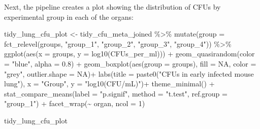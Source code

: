 \documentclass[
]{book}
\newenvironment{Shaded}{\begin{snugshade}}{\end{snugshade}}
\newcommand{\AttributeTok}[1]{\textcolor[rgb]{0.77,0.63,0.00}{#1}}
\newcommand{\ConstantTok}[1]{\textcolor[rgb]{0.00,0.00,0.00}{#1}}
\newcommand{\DecValTok}[1]{\textcolor[rgb]{0.00,0.00,0.81}{#1}}
\newcommand{\FloatTok}[1]{\textcolor[rgb]{0.00,0.00,0.81}{#1}}
\newcommand{\FunctionTok}[1]{\textcolor[rgb]{0.00,0.00,0.00}{#1}}
\newcommand{\NormalTok}[1]{#1}
\newcommand{\OtherTok}[1]{\textcolor[rgb]{0.56,0.35,0.01}{#1}}
\newcommand{\SpecialCharTok}[1]{\textcolor[rgb]{0.00,0.00,0.00}{#1}}
\newcommand{\StringTok}[1]{\textcolor[rgb]{0.31,0.60,0.02}{#1}}
\begin{document}
Next, the pipeline creates a plot showing the distribution of CFUs by
experimental group in each of the organs:

\begin{Shaded}
\begin{Highlighting}[]
\NormalTok{tidy\_lung\_cfu\_plot }\OtherTok{\textless{}{-}}\NormalTok{ tidy\_cfu\_meta\_joined }\SpecialCharTok{\%\textgreater{}\%}
  \FunctionTok{mutate}\NormalTok{(}\AttributeTok{group =} \FunctionTok{fct\_relevel}\NormalTok{(groups, }\StringTok{"group\_1"}\NormalTok{, }\StringTok{"group\_2"}\NormalTok{, }\StringTok{"group\_3"}\NormalTok{, }\StringTok{"group\_4"}\NormalTok{)) }\SpecialCharTok{\%\textgreater{}\%}
  \FunctionTok{ggplot}\NormalTok{(}\FunctionTok{aes}\NormalTok{(}\AttributeTok{x =}\NormalTok{ groups, }\AttributeTok{y =} \FunctionTok{log10}\NormalTok{(CFUs\_per\_ml))) }\SpecialCharTok{+}
    \FunctionTok{geom\_quasirandom}\NormalTok{(}\AttributeTok{color =} \StringTok{"blue"}\NormalTok{, }\AttributeTok{alpha =} \FloatTok{0.8}\NormalTok{) }\SpecialCharTok{+}
  \FunctionTok{geom\_boxplot}\NormalTok{(}\FunctionTok{aes}\NormalTok{(}\AttributeTok{group =}\NormalTok{ groups), }\AttributeTok{fill =} \ConstantTok{NA}\NormalTok{, }\AttributeTok{color =} \StringTok{"grey"}\NormalTok{, }\AttributeTok{outlier.shape =} \ConstantTok{NA}\NormalTok{)}\SpecialCharTok{+}
  \FunctionTok{labs}\NormalTok{(}\AttributeTok{title =} \FunctionTok{paste0}\NormalTok{(}\StringTok{"CFUs in early infected mouse lung"}\NormalTok{), }
       \AttributeTok{x =} \StringTok{"Group"}\NormalTok{, }\AttributeTok{y =} \StringTok{"log10(CFU/mL)"}\NormalTok{)}\SpecialCharTok{+}
  \FunctionTok{theme\_minimal}\NormalTok{() }\SpecialCharTok{+}
  \FunctionTok{stat\_compare\_means}\NormalTok{(}\AttributeTok{label =} \StringTok{"p.signif"}\NormalTok{, }\AttributeTok{method =} \StringTok{"t.test"}\NormalTok{, }\AttributeTok{ref.group =} \StringTok{"group\_1"}\NormalTok{) }\SpecialCharTok{+} 
  \FunctionTok{facet\_wrap}\NormalTok{(}\SpecialCharTok{\textasciitilde{}}\NormalTok{ organ, }\AttributeTok{ncol =} \DecValTok{1}\NormalTok{)}

\NormalTok{tidy\_lung\_cfu\_plot}
\end{Highlighting}
\end{Shaded}
\end{document}
